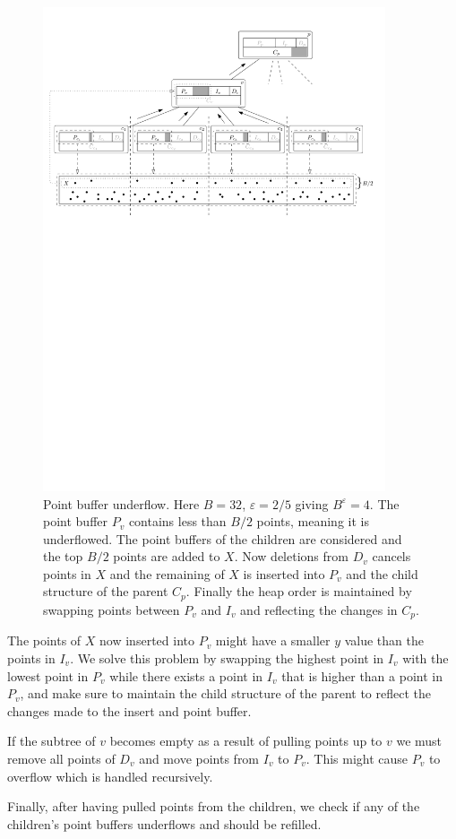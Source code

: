 \documentclass[twoside,11pt,openright]{report}
\def \epsilon {\varepsilon}
\begin{document}
\begin{enumerate}[label=(\roman*)]
	\begin{figure}[htp!]
		\centering
		\includegraphics[width=0.9\textwidth]{../figures/brodal_point_buffer_underflow}
		\caption{Point buffer underflow. Here $B = 32$, $\epsilon = 2/5$ giving $B^\epsilon = 4$. The point buffer $P_v$ contains less than $B/2$ points, meaning it is underflowed. The point buffers of the children are considered and the top $B/2$ points are added to $X$. Now deletions from $D_v$ cancels points in $X$ and the remaining of $X$ is inserted into $P_v$ and the child structure of the parent $C_p$. Finally the heap order is maintained by swapping points between $P_v$ and $I_v$ and reflecting the changes in $C_p$.}
		\label{fig:brodal_pb_underflow}
	\end{figure}
	
	The points of $X$ now inserted into $P_v$ might have a smaller $y$ value than the points in $I_v$. We solve this problem by swapping the highest point in $I_v$ with the lowest point in $P_v$ while there exists a point in $I_v$ that is higher than a point in $P_v$, and make sure to maintain the child structure of the parent to reflect the changes made to the insert and point buffer.
	
	If the subtree of $v$ becomes empty as a result of pulling points up to $v$ we must remove all points of $D_v$ and move points from $I_v$ to $P_v$. This might cause $P_v$ to overflow which is handled recursively.
	
	Finally, after having pulled points from the children, we check if any of the children's point buffers underflows and should be refilled.
\end{enumerate}
\end{document}
